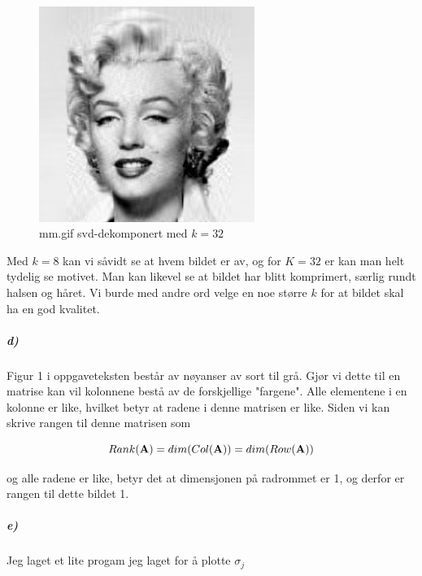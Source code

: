 \documentclass[a4paper,norsk, 10pt]{article}
\begin{document}
\begin{figure}[H]
\begin{center}
\includegraphics[width = 70mm]{k32.png}
\caption{mm.gif svd-dekomponert med $k=32$}
\end{center}
\end{figure}

Med $k = 8$ kan vi såvidt se at hvem bildet er av, og for $K=32$ er kan man helt tydelig se motivet. Man kan likevel se at bildet har blitt komprimert, særlig rundt halsen og håret. Vi burde med andre ord velge en noe større $k$ for at bildet skal ha en god kvalitet.

\subparagraph*{d)}

Figur 1 i oppgaveteksten består av nøyanser av sort til grå. Gjør vi dette til en matrise kan vil kolonnene bestå av de forskjellige "fargene". Alle elementene i en kolonne er like, hvilket betyr at radene i denne matrisen er like. Siden vi kan skrive rangen til denne matrisen som 

$$Rank(\bold{A}) = dim(Col(\bold{A})) = dim(Row(\bold{A}))$$

og alle radene er like, betyr det at dimensjonen på radrommet er 1, og derfor er rangen til dette bildet 1.

\subparagraph*{e)}

Jeg laget et lite progam jeg laget for å plotte $\sigma_j$


\end{document}
